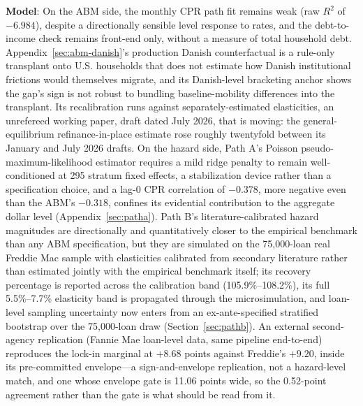 \textbf{Model}: On the ABM side, the monthly CPR path fit remains weak (raw $R^2$ of $-6.984$), despite a directionally sensible level response to rates, and the debt-to-income check remains front-end only, without a measure of total household debt. Appendix~\ref{sec:abm-danish}'s production Danish counterfactual is a rule-only transplant onto U.S. households that does not estimate how Danish institutional frictions would themselves migrate, and its Danish-level bracketing anchor shows the gap's sign is not robust to bundling baseline-mobility differences into the transplant. Its recalibration runs against  separately-estimated elasticities, an unrefereed working paper, draft dated July 2026, that is moving: the general-equilibrium refinance-in-place estimate rose roughly twentyfold between its January and July 2026 drafts. On the hazard side, Path A's Poisson pseudo-maximum-likelihood estimator requires a mild ridge penalty to remain well-conditioned at 295 stratum fixed effects, a stabilization device rather than a specification choice, and a lag-0 CPR correlation of $-0.378$, more negative even than the ABM's $-0.318$, confines its evidential contribution to the aggregate dollar level (Appendix~\ref{sec:patha}). Path B's literature-calibrated hazard magnitudes are directionally and quantitatively closer to the empirical benchmark than any ABM specification, but they are simulated on the 75,000-loan real Freddie Mac sample with elasticities calibrated from secondary literature rather than estimated jointly with the empirical benchmark itself; its recovery percentage is reported across the calibration band (105.9\%--108.2\%), its full 5.5\%--7.7\% elasticity band is propagated through the microsimulation, and loan-level sampling uncertainty now enters from an ex-ante-specified stratified bootstrap over the 75,000-loan draw (Section~\ref{sec:pathb}). An external second-agency replication (Fannie Mae loan-level data, same pipeline end-to-end) reproduces the lock-in marginal at $+8.68$ points against Freddie's $+9.20$, inside its pre-committed envelope---a sign-and-envelope replication, not a hazard-level match, and one whose envelope gate is 11.06 points wide, so the 0.52-point agreement rather than the gate is what should be read from it.

